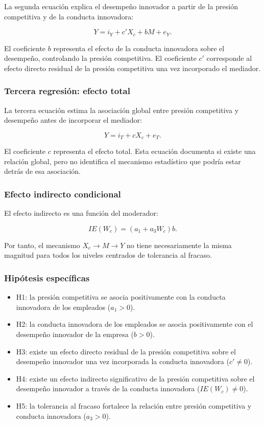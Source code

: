 \documentclass[12pt,letterpaper]{article}
\begin{document}
La segunda ecuación explica el desempeño innovador a partir de la presión competitiva y de la conducta innovadora:

\begin{equation}
Y=i_Y+c'X_c+bM+e_Y.
\end{equation}

El coeficiente $b$ representa el efecto de la conducta innovadora sobre el desempeño, controlando la presión competitiva. El coeficiente $c'$ corresponde al efecto directo residual de la presión competitiva una vez incorporado el mediador.

\subsubsection{Tercera regresión: efecto total}

La tercera ecuación estima la asociación global entre presión competitiva y desempeño antes de incorporar el mediador:

\begin{equation}
Y=i_T+cX_c+e_T.
\end{equation}

El coeficiente $c$ representa el efecto total. Esta ecuación documenta si existe una relación global, pero no identifica el mecanismo estadístico que podría estar detrás de esa asociación.

\subsubsection{Efecto indirecto condicional}

El efecto indirecto es una función del moderador:

\begin{equation}
IE(W_c)=(a_1+a_3W_c)b.
\end{equation}

Por tanto, el mecanismo $X_c\rightarrow M\rightarrow Y$ no tiene necesariamente la misma magnitud para todos los niveles centrados de tolerancia al fracaso.

\subsubsection{Hipótesis específicas}

\begin{itemize}
\item H1: la presión competitiva se asocia positivamente con la conducta innovadora de los empleados ($a_1>0$).
\item H2: la conducta innovadora de los empleados se asocia positivamente con el desempeño innovador de la empresa ($b>0$).
\item H3: existe un efecto directo residual de la presión competitiva sobre el desempeño innovador una vez incorporada la conducta innovadora ($c'\neq0$).
\item H4: existe un efecto indirecto significativo de la presión competitiva sobre el desempeño innovador a través de la conducta innovadora ($IE(W_c)\neq0$).
\item H5: la tolerancia al fracaso fortalece la relación entre presión competitiva y conducta innovadora ($a_3>0$).
\end{itemize}
\end{document}
